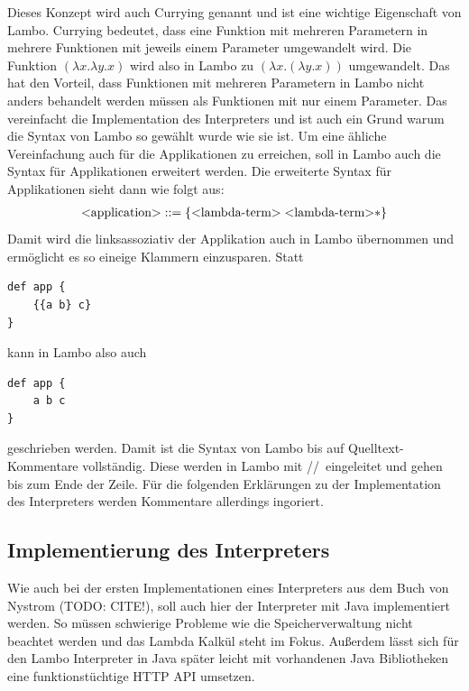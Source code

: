 \documentclass[ngerman]{article}
\begin{document}
Dieses Konzept wird auch Currying genannt und ist eine wichtige Eigenschaft von Lambo. Currying bedeutet, dass eine Funktion mit mehreren Parametern in mehrere Funktionen mit jeweils einem Parameter umgewandelt wird. Die Funktion $(\lambda x.\lambda y.x)$ wird also in Lambo zu $(\lambda x.(\lambda y.x))$ umgewandelt. Das hat den Vorteil, dass Funktionen mit mehreren Parametern in Lambo nicht anders behandelt werden müssen als Funktionen mit nur einem Parameter. Das vereinfacht die Implementation des Interpreters und ist auch ein Grund warum die Syntax von Lambo so gewählt wurde wie sie ist. Um eine ähliche Vereinfachung auch für die Applikationen zu erreichen, soll in Lambo auch die Syntax für Applikationen erweitert werden. Die erweiterte Syntax für Applikationen sieht dann wie folgt aus:
\begin{align*}
    \text{\textless application\textgreater} & ::= \{\text{\textless lambda-term\textgreater} \; \text{\textless lambda-term\textgreater}*\} \\
\end{align*}
Damit wird die linksassoziativ der Applikation auch in Lambo übernommen und ermöglicht es so eineige Klammern einzusparen. Statt
\begin{lstlisting}
def app {
    {{a b} c}
}
\end{lstlisting}
kann in Lambo also auch
\begin{lstlisting}
def app {
    a b c
}
\end{lstlisting}
geschrieben werden. Damit ist die Syntax von Lambo bis auf Quelltext-Kommentare vollständig. Diese werden in Lambo mit \slash\slash\ eingeleitet und gehen bis zum Ende der Zeile. Für die folgenden Erklärungen zu der Implementation des Interpreters werden Kommentare allerdings ingoriert.

\subsection{Implementierung des Interpreters}

\captionsetup{labelformat=empty}
\lstset{
    language=Java,
    frame=single,
    breaklines=true,
    numbers=left,
    stepnumber=1,
    showstringspaces=false,
    tabsize=1,
    breaklines=true,
    breakatwhitespace=false,
    xleftmargin=.1\textwidth,
    xrightmargin=.1\textwidth
}

Wie auch bei der ersten Implementationen eines Interpreters aus dem Buch von Nystrom (TODO: CITE!), soll auch hier der Interpreter mit Java implementiert werden. So müssen schwierige Probleme wie die Speicherverwaltung nicht beachtet werden und das Lambda Kalkül steht im Fokus. Außerdem lässt sich für den Lambo Interpreter in Java später leicht mit vorhandenen Java Bibliotheken eine funktionstüchtige HTTP API umsetzen.
\end{document}
